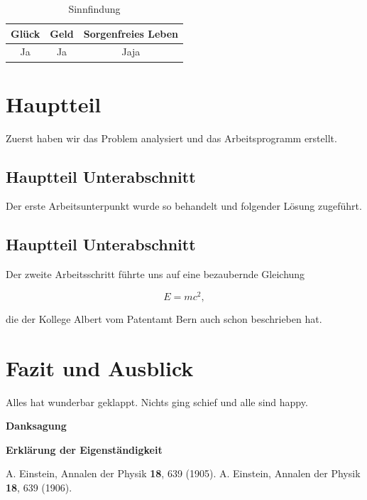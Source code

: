 \documentclass[a4paper,12pt]{article}
\begin{document}
\begin{table}[h]
	\centering
	\begin{tabular}{|c|c|c|}
	\hline
		Gl\"uck & Geld  & Sorgenfreies Leben  \\ \hline
		Ja  & Ja & Jaja \\ \hline
	\end{tabular}
	\caption{Sinnfindung}
	\label{Tab1}
\end{table}


\section{Hauptteil}\label{sec2}

Zuerst haben wir das Problem analysiert und das Arbeitsprogramm erstellt.

\subsection{Hauptteil Unterabschnitt}\label{sec2.1}

Der erste Arbeitsunterpunkt wurde so behandelt und folgender L\"osung zugef\"uhrt.

\subsection{Hauptteil Unterabschnitt}\label{sec2.2}

Der zweite Arbeitsschritt f\"uhrte uns auf eine bezaubernde Gleichung

\begin{equation}
	E = mc^2 ,
\end{equation}

die der Kollege Albert vom Patentamt Bern  \cite{Alb05} auch schon beschrieben hat.


\section{Fazit und Ausblick}\label{sec3}

Alles hat wunderbar geklappt. Nichts ging schief und alle sind happy.


\bigskip


{\large\bf Danksagung}

\bigskip


{\large\bf Erkl\"arung der Eigenst\"andigkeit}

\bigskip


\begin{thebibliography}{99}
	\itemsep-2pt \small\frenchspacing
	A. Einstein, Annalen der Physik {\bf 18}, 639 (1905).
	\newline
	A. Einstein, Annalen der Physik {\bf 18}, 639 (1906).
\end{thebibliography}
\end{document}
